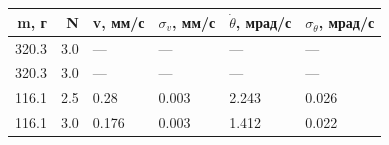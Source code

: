 \begin{tabular}{rrllll}
\toprule
m, г & N & v, мм/с & $\sigma_v$, мм/с & $\dot{\theta}$, мрад/с & $\sigma_{\dot{\theta}}$, мрад/с \\
\midrule
320.3 & 3.0 & --- & --- & --- & --- \\
320.3 & 3.0 & --- & --- & --- & --- \\
116.1 & 2.5 & 0.28 & 0.003 & 2.243 & 0.026 \\
116.1 & 3.0 & 0.176 & 0.003 & 1.412 & 0.022 \\
\bottomrule
\end{tabular}
